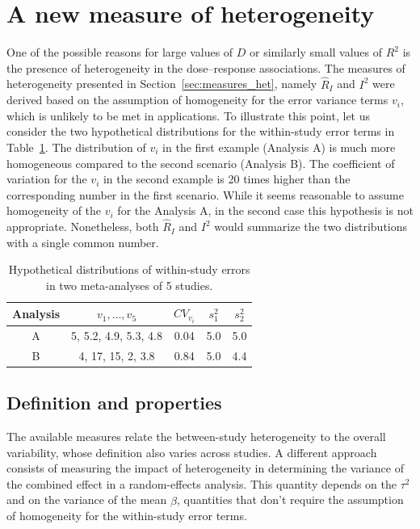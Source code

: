 \documentclass[11pt,a4paper,twoside,openany]{book}\usepackage{knitr}
\begin{document}
{{\section{A new measure of heterogeneity}\label{sec:Rb}

One of the possible reasons for large values of $D$ or similarly small values of $R^2$ is the presence of heterogeneity in the dose--response associations. The measures of heterogeneity presented in Section~\ref{sec:measures_het}, namely $\hat R_I$ and $I^2$ were derived based on the assumption of homogeneity for the error variance terms $v_i$, which is unlikely to be met in applications. To illustrate this point, let us consider the two hypothetical distributions for the within-study error terms in Table~\ref{tab:hyp_vi}. The distribution of $v_i$ in the first example (Analysis A) is much more homogeneous compared to the second scenario (Analysis B). The coefficient of variation for the $v_i$ in the second example is 20 times higher than the corresponding number in the first scenario. While it seems reasonable to assume homogeneity of the $v_i$ for the Analysis A, in the second case this hypothesis is not appropriate. Nonetheless, both $\hat R_I$ and $I^2$ would summarize the two distributions with a single common number. 

\begin{table}[ht]
\centering
\caption{Hypothetical distributions of within-study errors 
in two meta-analyses of 5 studies.} 
\label{tab:hyp_vi}
\begin{tabular}{ccccc}
  \hline
Analysis & $v_1, \dots, v_5$ & $CV_{v_i}$ & $s_1^2$ & $s_2^2$ \\ 
  \hline
A & 5, 5.2, 4.9, 5.3, 4.8 & 0.04 & 5.0 & 5.0 \\ 
  B & 4, 17, 15, 2, 3.8 & 0.84 & 5.0 & 4.4 \\ 
   \hline
\end{tabular}
\end{table}


\subsection{Definition and properties}

The available measures relate the between-study heterogeneity to the overall variability, whose definition also varies across studies. A different approach consists of measuring the impact of heterogeneity in determining the variance of the combined effect in a random-effects analysis. This quantity depends on the $\tau^2$ and on the variance of the mean $\hat \beta$, quantities that don't require the assumption of homogeneity for the within-study error terms.

}}
\end{document}
